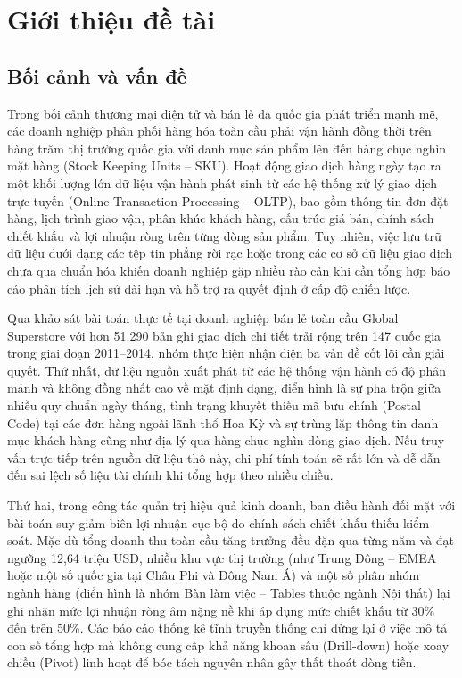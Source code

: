 \section{Giới thiệu đề tài}

\subsection{Bối cảnh và vấn đề}

Trong bối cảnh thương mại điện tử và bán lẻ đa quốc gia phát triển mạnh mẽ, các doanh nghiệp phân phối hàng hóa toàn cầu phải vận hành đồng thời trên hàng trăm thị trường quốc gia với danh mục sản phẩm lên đến hàng chục nghìn mặt hàng (Stock Keeping Units -- SKU). Hoạt động giao dịch hàng ngày tạo ra một khối lượng lớn dữ liệu vận hành phát sinh từ các hệ thống xử lý giao dịch trực tuyến (Online Transaction Processing -- OLTP), bao gồm thông tin đơn đặt hàng, lịch trình giao vận, phân khúc khách hàng, cấu trúc giá bán, chính sách chiết khấu và lợi nhuận ròng trên từng dòng sản phẩm. Tuy nhiên, việc lưu trữ dữ liệu dưới dạng các tệp tin phẳng rời rạc hoặc trong các cơ sở dữ liệu giao dịch chưa qua chuẩn hóa khiến doanh nghiệp gặp nhiều rào cản khi cần tổng hợp báo cáo phân tích lịch sử dài hạn và hỗ trợ ra quyết định ở cấp độ chiến lược.

Qua khảo sát bài toán thực tế tại doanh nghiệp bán lẻ toàn cầu Global Superstore với hơn 51.290 bản ghi giao dịch chi tiết trải rộng trên 147 quốc gia trong giai đoạn 2011--2014, nhóm thực hiện nhận diện ba vấn đề cốt lõi cần giải quyết. Thứ nhất, dữ liệu nguồn xuất phát từ các hệ thống vận hành có độ phân mảnh và không đồng nhất cao về mặt định dạng, điển hình là sự pha trộn giữa nhiều quy chuẩn ngày tháng, tình trạng khuyết thiếu mã bưu chính (Postal Code) tại các đơn hàng ngoài lãnh thổ Hoa Kỳ và sự trùng lặp thông tin danh mục khách hàng cũng như địa lý qua hàng chục nghìn dòng giao dịch. Nếu truy vấn trực tiếp trên nguồn dữ liệu thô này, chi phí tính toán sẽ rất lớn và dễ dẫn đến sai lệch số liệu tài chính khi tổng hợp theo nhiều chiều.

Thứ hai, trong công tác quản trị hiệu quả kinh doanh, ban điều hành đối mặt với bài toán suy giảm biên lợi nhuận cục bộ do chính sách chiết khấu thiếu kiểm soát. Mặc dù tổng doanh thu toàn cầu tăng trưởng đều đặn qua từng năm và đạt ngưỡng 12,64 triệu USD, nhiều khu vực thị trường (như Trung Đông -- EMEA hoặc một số quốc gia tại Châu Phi và Đông Nam Á) và một số phân nhóm ngành hàng (điển hình là nhóm Bàn làm việc -- Tables thuộc ngành Nội thất) lại ghi nhận mức lợi nhuận ròng âm nặng nề khi áp dụng mức chiết khấu từ 30\% đến trên 50\%. Các báo cáo thống kê tĩnh truyền thống chỉ dừng lại ở việc mô tả con số tổng hợp mà không cung cấp khả năng khoan sâu (Drill-down) hoặc xoay chiều (Pivot) linh hoạt để bóc tách nguyên nhân gây thất thoát dòng tiền.

